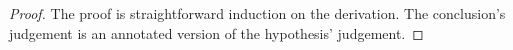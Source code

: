 {\centering
{}}

\begin{proof}
  The proof is straightforward induction on the derivation. The conclusion's judgement
  is an annotated version of the hypothesis' judgement.
\end{proof}

